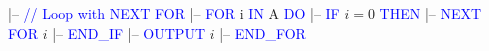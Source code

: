\documentclass{article}
\begin{document}
\begin{algorithm}
\caption{}
\begin{algorithmic}[1]
\STATE |-- \textcolor [HTML]{0000FF}{// Loop with NEXT FOR}
\STATE |-- \textcolor [HTML]{0000FF}{FOR} i \textcolor [HTML]{0000FF}{IN} A \textcolor [HTML]{0000FF}{DO}
\STATE |-- \textcolor [HTML]{0000FF}{IF} $i = 0$ \textcolor [HTML]{0000FF}{THEN}
\STATE |-- \textcolor [HTML]{0000FF}{NEXT} \textcolor [HTML]{0000FF}{FOR} $i$
\STATE |-- \textcolor [HTML]{0000FF}{END\_IF}
\STATE |-- \textcolor [HTML]{0000FF}{OUTPUT} $i$
\STATE |-- \textcolor [HTML]{0000FF}{END\_FOR}
\end{algorithmic}
\end{algorithm}
\end{document}
